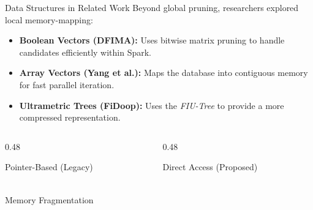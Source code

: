 \begin{frame}[t]{Data Structures in Related Work}
    Beyond global pruning, researchers explored local memory-mapping:
    
    \begin{itemize}
        \item \small \textbf{Boolean Vectors (DFIMA):} Uses bitwise matrix pruning to handle candidates efficiently within Spark.
        \item \small \textbf{Array Vectors (Yang et al.):} Maps the database into contiguous memory for fast parallel iteration.
        \item \small \textbf{Ultrametric Trees (FiDoop):} Uses the \textit{FIU-Tree} to provide a more compressed representation.
    \end{itemize}

    \vspace{0.1cm}
    \begin{columns}[T]
        \begin{column}{0.48\textwidth}
            \begin{alertblock}{Pointer-Based (Legacy)}
                \scriptsize \centering
                \\
                Memory Fragmentation
            \end{alertblock}
        \end{column}
        
        \begin{column}{0.48\textwidth}
            \begin{alertblock}{Direct Access (Proposed)}
                \scriptsize \centering
\end{alertblock}
\end{column}
\end{columns}
\end{frame}
